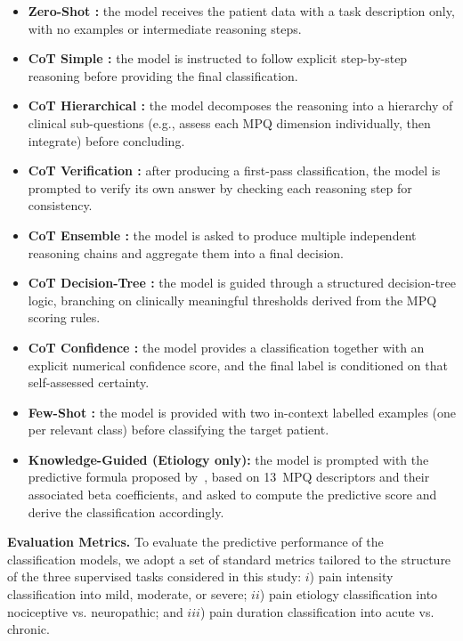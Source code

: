\documentclass[preprint,12pt,authoryear]{elsarticle}
\begin{document}
\begin{itemize}[itemsep=1pt, parsep=1pt, topsep=2pt, leftmargin=10pt]
    \item \textbf{Zero-Shot \citep{ERONEN2022102981}:} the model receives the patient data with a task description only, with no examples or intermediate reasoning steps.
    \item \textbf{CoT Simple \citep{wei2022chain}:} the model is instructed to follow explicit step-by-step reasoning before providing the final classification.
    \item \textbf{CoT Hierarchical \citep{wang2025hcott}:} the model decomposes the reasoning into a hierarchy of clinical sub-questions (e.g., assess each MPQ dimension individually, then integrate) before concluding.
    \item \textbf{CoT Verification \citep{dhuliawala2024chain}:} after producing a first-pass classification, the model is prompted to verify its own answer by checking each reasoning step for consistency.
    \item \textbf{CoT Ensemble \citep{wang2022self}:} the model is asked to produce multiple independent reasoning chains and aggregate them into a final decision.
    \item \textbf{CoT Decision-Tree \citep{yao2023tree}:} the model is guided through a structured decision-tree logic, branching on clinically meaningful thresholds derived from the MPQ scoring rules.
    \item \textbf{CoT Confidence \citep{kadavath2022language}:} the model provides a classification together with an explicit numerical confidence score, and the final label is conditioned on that self-assessed certainty.
    \item \textbf{Few-Shot \citep{brown2020language}:} the model is provided with two in-context labelled examples (one per relevant class) before classifying the target patient.
    \item \textbf{Knowledge-Guided \citep{wang2023self} (Etiology only):} the model is prompted with the predictive formula proposed by~\citep{wilkie2001nociceptive}, based on 13~MPQ descriptors and their associated beta coefficients, and asked to compute the predictive score and derive the classification accordingly.
\end{itemize}

\textbf{Evaluation Metrics.}
To evaluate the predictive performance of the classification models, we adopt a set of standard metrics tailored to the structure of the three supervised tasks considered in this study: $i$) pain intensity classification into mild, moderate, or severe; $ii$) pain etiology classification into nociceptive vs. neuropathic; and $iii$) pain duration classification into acute vs. chronic.
\end{document}
